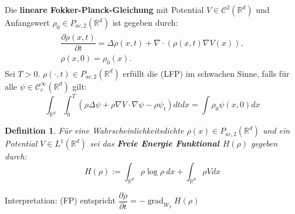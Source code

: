 \documentclass[11pt,a4paper,notitlepage]{scrreprt}
\newcommand{\RR}{\mathbb{R}}
\newcommand{\grad}{\operatorname{grad}}
\newtheorem{defi}{Definition}[section]
\begin{document}
Die \textbf{lineare Fokker-Planck-Gleichung}  mit Potential ${V\in \mathcal{C}^2(\RR^d)}$ und Anfangswert $\rho_0\in P_{ac,2}(\RR^d)$ ist gegeben durch:
\begin{align}\tag{FP}
\begin{split}
\dfrac{\partial\rho(x,t)}{\partial t}=\Delta\rho(x,t)+\nabla\cdot(\rho(x,t)\nabla V(x)),\\
\rho(x,0)=\rho_0(x).\label{FP}
\end{split}
\end{align}
Sei $T>0$. $\rho(\cdot,t)\in P_{ac,2}(\RR^d)$ erfüllt die (LFP) im schwachen Sinne, falls für alle $\psi\in \mathcal{C}_c^\infty(\RR^d)$ gilt:
\begin{equation}
\int_{\RR^d} \int_0^T (\rho\Delta\psi+\rho\nabla V\cdot\nabla\psi -\rho\psi_t) dt dx=\int\rho_0\psi(x,0)dx \label{FPweak}
\end{equation}

\vspace{10pt}

\begin{defi}
Für eine Wahrscheinlichkeitsdichte $\rho(x)\in P_{ac,2}(\RR^d)$ und ein Potential $V\in L^1(\RR^d)$ sei das \textbf{Freie Energie Funktional $H(\rho)$} gegeben durch:
\begin{equation}
H(\rho):=\int_{\RR^d} \rho\log\rho~ dx + \int_{\RR^d}\rho V dx \label{FEFktn}
\end{equation}
\end{defi}
\vspace{10pt}
Interpretation: (FP) entspricht $\dfrac{\partial\rho}{\partial t} = -\grad_{W_2} H(\rho)$
\end{document}
